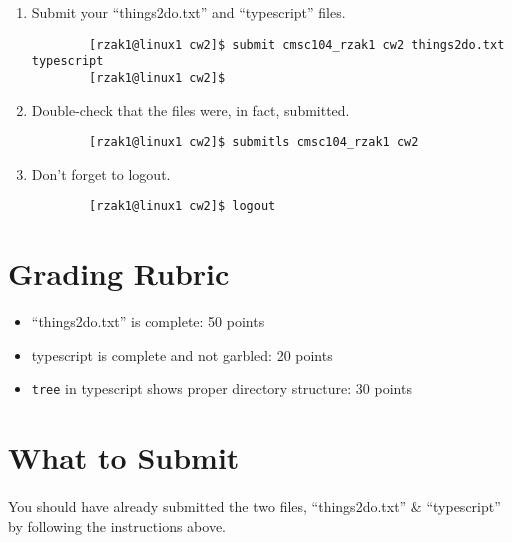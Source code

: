 \documentclass[letter,11pt]{article}
\begin{document}
\begin{enumerate}
\begin{verbatim}
        [rzak1@linux1 cw2]$ cat typescript
        NOTE: The contents of your file (the commands you’ve
        just executed and their results) should display here.
        [rzak1@linux1 cw2]$
    \end{verbatim}
    \item Submit your ``things2do.txt'' and ``typescript'' files.
    \begin{verbatim}
        [rzak1@linux1 cw2]$ submit cmsc104_rzak1 cw2 things2do.txt typescript
        [rzak1@linux1 cw2]$
    \end{verbatim}
    \item Double-check that the files were, in fact, submitted.
    \begin{verbatim}
        [rzak1@linux1 cw2]$ submitls cmsc104_rzak1 cw2
    \end{verbatim}
    \item Don’t forget to logout.
    \begin{verbatim}
        [rzak1@linux1 cw2]$ logout
    \end{verbatim}
\end{enumerate}

\section*{Grading Rubric}
\begin{itemize}
    \item ``things2do.txt'' is complete: 50 points
    \item typescript is complete and not garbled: 20 points
    \item \texttt{tree} in typescript shows proper directory structure: 30 points
\end{itemize}

\section*{What to Submit}
\paragraph{}You should have already submitted the two files, ``things2do.txt'' \& ``typescript'' by following the instructions above.
\end{document}
